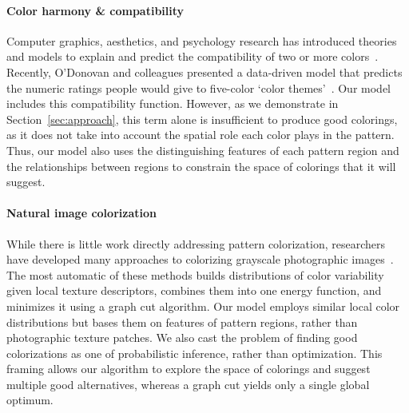 \paragraph{Color harmony \& compatibility}
Computer graphics, aesthetics, and psychology research has introduced theories and models to explain and predict the compatibility of two or more colors~\cite{CohenOrHarmonization,Munsell,PalmerColorPreference, Itten}. Recently, O'Donovan and colleagues presented a data-driven model that predicts the numeric ratings people would give to five-color `color themes'~.
Our model includes this compatibility function. However, as we demonstrate in Section~\ref{sec:approach}, this term alone is insufficient to produce good colorings, as it does not take into account the spatial role each color plays in the pattern. Thus, our model also uses the distinguishing features of each pattern region and the relationships between regions to constrain the space of colorings that it will suggest.

\paragraph{Natural image colorization}
While there is little work directly addressing pattern colorization, researchers have developed many approaches to colorizing grayscale photographic images~\cite{ScribbleColorization,TransferColorization}. The most automatic of these methods builds distributions of color variability given local texture descriptors, combines them into one energy function, and minimizes it using a graph cut algorithm. Our model employs similar local color distributions but bases them on features of pattern regions, rather than photographic texture patches. We also cast the problem of finding good colorizations as one of probabilistic inference, rather than optimization. This framing allows our algorithm to explore the space of colorings and suggest multiple good alternatives, whereas a graph cut yields only a single global optimum.

